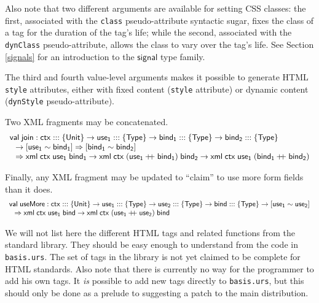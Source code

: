 \documentclass{article}
\newcommand{\cd}[1]{\texttt{#1}}
\newcommand{\mt}[1]{\mathsf{#1}}
\newcommand{\rc}{+ \hspace{-.075in} + \;}
\begin{document}
Also note that two different arguments are available for setting CSS classes: the first, associated with the \texttt{class} pseudo-attribute syntactic sugar, fixes the class of a tag for the duration of the tag's life; while the second, associated with the \texttt{dynClass} pseudo-attribute, allows the class to vary over the tag's life.  See Section \ref{signals} for an introduction to the $\mt{signal}$ type family.

The third and fourth value-level arguments makes it possible to generate HTML \cd{style} attributes, either with fixed content (\cd{style} attribute) or dynamic content (\cd{dynStyle} pseudo-attribute).

Two XML fragments may be concatenated.
$$\begin{array}{l}
  \mt{val} \; \mt{join} : \mt{ctx} ::: \{\mt{Unit}\} \to \mt{use_1} ::: \{\mt{Type}\} \to \mt{bind_1} ::: \{\mt{Type}\} \to \mt{bind_2} ::: \{\mt{Type}\} \\
  \hspace{.1in} \to [\mt{use_1} \sim \mt{bind_1}] \Rightarrow [\mt{bind_1} \sim \mt{bind_2}] \\
  \hspace{.1in} \Rightarrow \mt{xml} \; \mt{ctx} \; \mt{use_1} \; \mt{bind_1} \to \mt{xml} \; \mt{ctx} \; (\mt{use_1} \rc \mt{bind_1}) \; \mt{bind_2} \to \mt{xml} \; \mt{ctx} \; \mt{use_1} \; (\mt{bind_1} \rc \mt{bind_2})
\end{array}$$

Finally, any XML fragment may be updated to ``claim'' to use more form fields than it does.
$$\begin{array}{l}
  \mt{val} \; \mt{useMore} : \mt{ctx} ::: \{\mt{Unit}\} \to \mt{use_1} ::: \{\mt{Type}\} \to \mt{use_2} ::: \{\mt{Type}\} \to \mt{bind} ::: \{\mt{Type}\} \to [\mt{use_1} \sim \mt{use_2}] \\
  \hspace{.1in} \Rightarrow \mt{xml} \; \mt{ctx} \; \mt{use_1} \; \mt{bind} \to \mt{xml} \; \mt{ctx} \; (\mt{use_1} \rc \mt{use_2}) \; \mt{bind}
\end{array}$$

We will not list here the different HTML tags and related functions from the standard library.  They should be easy enough to understand from the code in \texttt{basis.urs}.  The set of tags in the library is not yet claimed to be complete for HTML standards.  Also note that there is currently no way for the programmer to add his own tags.  It \emph{is} possible to add new tags directly to \texttt{basis.urs}, but this should only be done as a prelude to suggesting a patch to the main distribution.
\end{document}
